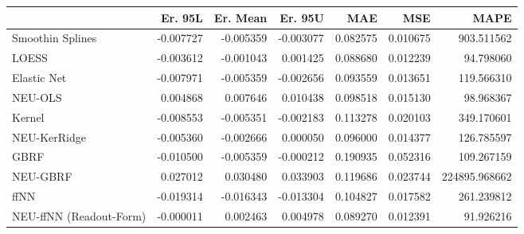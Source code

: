 \begin{tabular}{lrrrrrr}
\toprule
{} &   Er. 95L &  Er. Mean &   Er. 95U &       MAE &       MSE &           MAPE \\
\midrule
Smoothin Splines        & -0.007727 & -0.005359 & -0.003077 &  0.082575 &  0.010675 &     903.511562 \\
LOESS                   & -0.003612 & -0.001043 &  0.001425 &  0.088680 &  0.012239 &      94.798060 \\
Elastic Net             & -0.007971 & -0.005359 & -0.002656 &  0.093559 &  0.013651 &     119.566310 \\
NEU-OLS                 &  0.004868 &  0.007646 &  0.010438 &  0.098518 &  0.015130 &      98.968367 \\
Kernel                  & -0.008553 & -0.005351 & -0.002183 &  0.113278 &  0.020103 &     349.170601 \\
NEU-KerRidge            & -0.005360 & -0.002666 &  0.000050 &  0.096000 &  0.014377 &     126.785597 \\
GBRF                    & -0.010500 & -0.005359 & -0.000212 &  0.190935 &  0.052316 &     109.267159 \\
NEU-GBRF                &  0.027012 &  0.030480 &  0.033903 &  0.119686 &  0.023744 &  224895.968662 \\
ffNN                    & -0.019314 & -0.016343 & -0.013304 &  0.104827 &  0.017582 &     261.239812 \\
NEU-ffNN (Readout-Form) & -0.000011 &  0.002463 &  0.004978 &  0.089270 &  0.012391 &      91.926216 \\
\bottomrule
\end{tabular}
